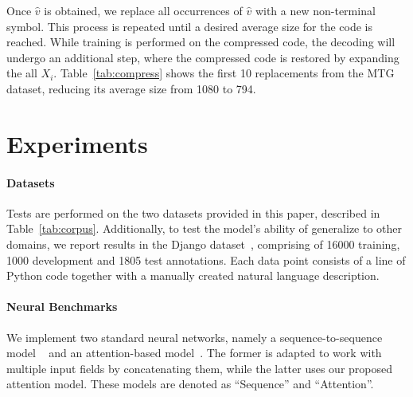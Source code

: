 \documentclass[11pt]{article}
\begin{document}
Once $\hat{v}$ is obtained, we replace all occurrences of $\hat{v}$ with a new
non-terminal symbol. This process is repeated until a desired average size for the
code is reached. While training is performed on the compressed code, the
decoding will undergo an additional step, where the compressed code is restored
by expanding the all $X_i$. Table~\ref{tab:compress} shows the first
10 replacements from the MTG dataset, reducing its average size from 1080 to 794.




\section{Experiments}
\label{sec:experiments}



\paragraph{Datasets} Tests are performed on the two datasets provided in this
paper, described in Table~\ref{tab:corpus}. Additionally, to test the model's
ability of generalize to other domains, we report results in the Django dataset~\cite{oda15ase},
comprising of 16000 training, 1000 development and 1805 test annotations. Each
data point consists of a line of Python code together with a manually created
natural language description.


\paragraph{Neural Benchmarks} We implement two standard
neural networks, namely a sequence-to-sequence model
~\cite{DBLP:journals/corr/SutskeverVL14} and an attention-based
model~\cite{DBLP:journals/corr/BahdanauCB14}. The former is
adapted to work with multiple input fields by concatenating them,
while the latter uses our proposed attention model. These models
are denoted as ``Sequence'' and ``Attention''.
\end{document}
